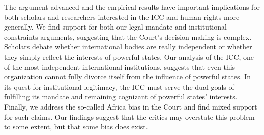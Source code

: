 The argument advanced and the empirical results have important implications for both scholars and researchers interested in the ICC and human rights more generally.  We find support for both our legal mandate and institutional constraints arguments, suggesting that the Court’s decision-making is complex. Scholars debate whether international bodies are really independent or whether they simply reflect the interests of powerful states. Our analysis of the ICC, one of the most independent international institutions, suggests that even this organization cannot fully divorce itself from the influence of powerful states.  In its quest for institutional legitimacy, the ICC must serve the dual goals of fulfilling its mandate and remaining cognizant of powerful states’ interests. Finally, we address the so-called Africa bias in the Court and find mixed support for such claims.  Our findings suggest that the critics may overstate this problem to some extent, but that some bias does exist. 
